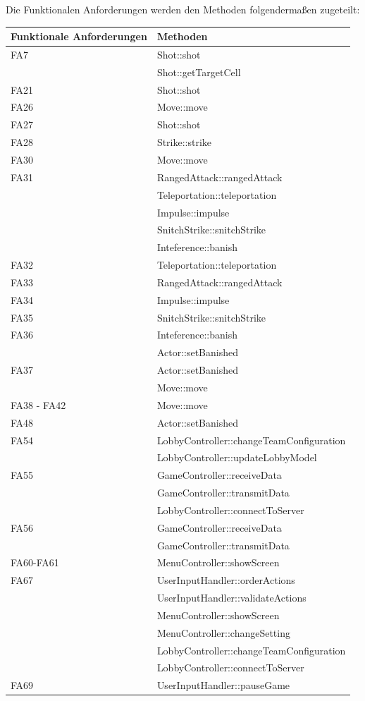 Die Funktionalen Anforderungen werden den Methoden folgendermaßen zugeteilt:
\begin{center}
	\begin{tabular}{|l|l|}
		\hline
		\textbf{Funktionale Anforderungen} & \textbf{Methoden}\\\hline
		FA7 & Shot::shot\\
		& Shot::getTargetCell\\\hline
		FA21 & Shot::shot\\\hline
		FA26 & Move::move\\\hline
		FA27 & Shot::shot\\\hline
		FA28 & Strike::strike\\\hline
		FA30 & Move::move\\\hline
		FA31 & RangedAttack::rangedAttack\\
		& Teleportation::teleportation\\
		& Impulse::impulse\\
		& SnitchStrike::snitchStrike\\
		& Inteference::banish\\\hline
		FA32 & Teleportation::teleportation\\\hline
		FA33 & RangedAttack::rangedAttack\\\hline
		FA34 & Impulse::impulse\\\hline
		FA35 & SnitchStrike::snitchStrike\\\hline
		FA36 & Inteference::banish\\
		& Actor::setBanished\\\hline
		FA37 & Actor::setBanished\\
		& Move::move\\\hline
		FA38 - FA42 & Move::move\\\hline
		FA48 & Actor::setBanished\\\hline
		FA54 & LobbyController::changeTeamConfiguration\\
		& LobbyController::updateLobbyModel\\\hline
		FA55 & GameController::receiveData\\
		& GameController::transmitData\\
		& LobbyController::connectToServer\\\hline
		FA56 & GameController::receiveData\\
		& GameController::transmitData\\\hline
		FA60-FA61 & MenuController::showScreen\\\hline
		FA67 & UserInputHandler::orderActions\\
		& UserInputHandler::validateActions\\
		& MenuController::showScreen\\
		& MenuController::changeSetting\\
		& LobbyController::changeTeamConfiguration\\
		& LobbyController::connectToServer\\\hline
		FA69 & UserInputHandler::pauseGame\\\hline
		
	\end{tabular}
\end{center}
